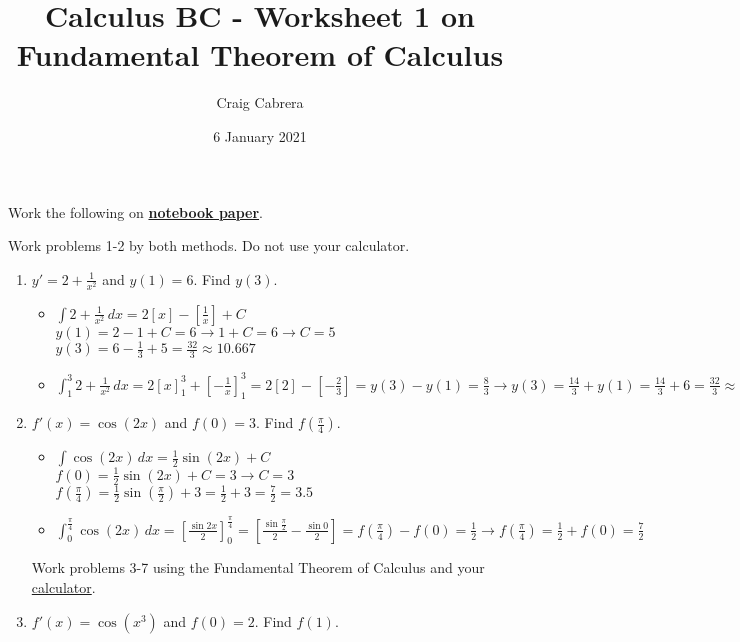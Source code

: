 \documentclass[10pt, letterpaper]{report}
\title{Calculus BC - Worksheet 1 on Fundamental Theorem of Calculus}
\author{Craig Cabrera}
\date{6 January 2021}
\begin{document}
\maketitle
Work the following on \textbf{\underline{notebook paper}}.

	Work problems 1-2 by both methods. Do not use your calculator.
	\begin{enumerate}
		\item{$y'=2+\frac{1}{x^{2}}$ and $y(1)=6$. Find $y(3)$.} \\
			\begin{itemize}
        \item{$\int{2+\frac{1}{x^{2}}}\,dx=
        2[x]-[\frac{1}{x}]+C$ \\

        $y(1)=2-1+C=6\rightarrow 1+C=6\rightarrow C=5$ \\

        $y(3)=6-\frac{1}{3}+5=\frac{32}{3}\approx 10.667$ \\}

        \item{$\int_{1}^{3}{2+\frac{1}{x^{2}}}\,dx=
        2[x]_{1}^{3}+[-\frac{1}{x}]_{1}^{3}=
        2[2]-[-\frac{2}{3}]=
        y(3)-y(1)=\frac{8}{3}\rightarrow
        y(3)=\frac{14}{3}+y(1)=
        \frac{14}{3}+6=
        \frac{32}{3}\approx10.667$ \\}

      \end{itemize}
		\item{$f'(x)=\cos{(2x)}$ and $f(0)=3$. Find $f(\frac{\pi}{4})$.} \\
      \begin{itemize}
        \item{$\int{\cos{(2x)}}\,dx=
        \frac{1}{2}\sin{(2x)}+C$ \\

        $f(0)=\frac{1}{2}\sin{(2x)}+C=3\rightarrow C=3$ \\

        $f(\frac{\pi}{4})=
        \frac{1}{2}\sin{(\frac{\pi}{2})}+3=
        \frac{1}{2}+3=\frac{7}{2}=3.5$ \\}

        \item{$\int_{0}^{\frac{\pi}{4}}{\cos{(2x)}}\,dx=
        [\frac{\sin{2x}}{2}]_{0}^{\frac{\pi}{4}}=
        [\frac{\sin{\frac{\pi}{2}}}{2}-\frac{\sin{0}}{2}]=
        f(\frac{\pi}{4})-f(0)=\frac{1}{2}\rightarrow
        f(\frac{\pi}{4})=\frac{1}{2}+f(0)=\frac{7}{2}$ \\}
      \end{itemize}
\hline
	\par Work problems 3-7 using the Fundamental Theorem of Calculus and your \underline{calculator}.
		\item{$f'(x)=\cos{(x^{3})}$ and $f(0)=2$. Find $f(1)$.} \\


\end{enumerate}
\end{document}
